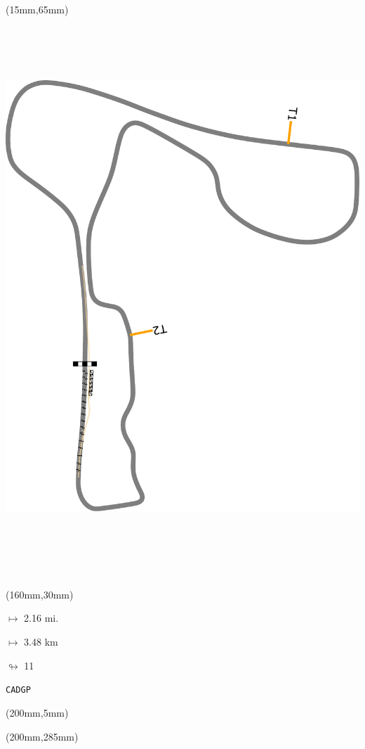 \begin{textblock*}{185mm}(15mm,65mm)%
\centering
\mbox{\includegraphics[width=185mm,height=210mm,keepaspectratio]{PT/CADGP.pdf}}
\end{textblock*}
\begin{textblock*}{40mm}(160mm,30mm)%
\Large
\par$\mapsto$ 2.16 mi.
\par$\mapsto$ 3.48 km
\par$\looparrowright$ 11
\par\hfill\tiny\tt CADGP\\
\end{textblock*}
\begin{textblock*}{20mm}(200mm,5mm)%
\fbox{\thepage}
\label{CADGP}
\end{textblock*}
\begin{textblock*}{20mm}(200mm,285mm)%
\fbox{\thepage}
\end{textblock*}

